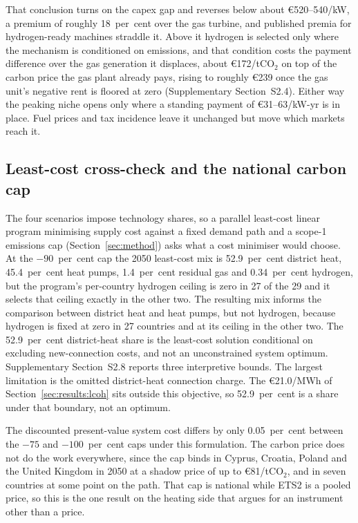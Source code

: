 That conclusion turns on the capex gap and reverses below about \euro{}520--540/kW, a premium of roughly 18~per~cent over the gas turbine, and published premia for hydrogen-ready machines straddle it. Above it hydrogen is selected only where the mechanism
is conditioned on emissions, and that condition costs the payment difference over the
gas generation it displaces, about \euro{}172/tCO$_2$ on top of the carbon price the gas
plant already pays, rising to roughly \euro{}239 once the gas unit's negative rent is
floored at zero (Supplementary Section~S2.4). Either way the peaking niche opens only where a standing payment of \euro{}31--63/kW-yr is in place. Fuel prices and tax incidence leave it unchanged
but move which markets reach it.

\subsection{Least-cost cross-check and the national carbon cap}
\label{sec:results:costopt}

The four scenarios impose technology shares, so a parallel least-cost linear program
minimising supply cost against a fixed demand path and a scope-1 emissions cap
(Section~\ref{sec:method}) asks what a cost minimiser would choose. At the $-90$~per~cent cap the 2050 least-cost mix is 52.9~per~cent district heat, 45.4~per~cent heat pumps, 1.4~per~cent residual gas and 0.34~per~cent hydrogen, but the program's per-country hydrogen ceiling is zero in 27 of the 29 and it selects that ceiling exactly in the other two. The resulting mix informs the comparison between district heat and heat pumps, but not hydrogen, because hydrogen is fixed at zero in 27 countries and at its ceiling in the other two. The 52.9~per~cent district-heat share is the least-cost solution conditional on excluding new-connection costs, and not an unconstrained system optimum. Supplementary Section~S2.8 reports three interpretive bounds. The largest limitation is the omitted district-heat connection charge. The \euro{}21.0/MWh of Section~\ref{sec:results:lcoh} sits outside this objective, so 52.9~per~cent is a share under that boundary, not an optimum.

The discounted present-value system cost differs by only 0.05~per~cent between the $-75$ and $-100$~per~cent caps under this formulation. The carbon price does not do the work everywhere, since the cap binds in Cyprus, Croatia,
Poland and the United Kingdom in 2050 at a shadow price of up to \euro{}81/tCO$_2$, and
in seven countries at some point on the path. That cap is national while ETS2 is a
pooled price, so this is the one result on the heating side that argues for an
instrument other than a price.

